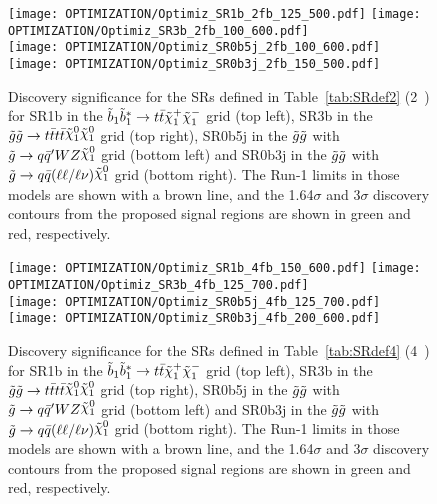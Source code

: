 \begin{figure}[!htb]
\centering
  \texttt{[image: OPTIMIZATION/Optimiz\_SR1b\_2fb\_125\_500.pdf]}
  \texttt{[image: OPTIMIZATION/Optimiz\_SR3b\_2fb\_100\_600.pdf]}\\
  \texttt{[image: OPTIMIZATION/Optimiz\_SR0b5j\_2fb\_100\_600.pdf]}
  \texttt{[image: OPTIMIZATION/Optimiz\_SR0b3j\_2fb\_150\_500.pdf]}
  \caption{Discovery significance for the SRs defined in Table~\ref{tab:SRdef2} (2~\ifb) for SR1b in the $\sbot\sbot^*\to t\bar t\tilde\chi_1^+\tilde\chi_1^-$ grid (top left), SR3b in the $\gluino\gluino\to t\bar tt\bar t\ninoone\ninoone$ grid (top right), SR0b5j in the $\tilde{g}\tilde{g}$ with $\gluino\to q\bar{q}'WZ\ninoone$ grid (bottom left) and SR0b3j in the $\tilde{g}\tilde{g}$ with $\gluino\to q\bar{q}(\ell\ell/\ell\nu)\ninoone$ grid (bottom right). The Run-1 limits in those models are shown with a brown line, and the 1.64$\sigma$ and 3$\sigma$ discovery contours from the proposed signal regions are shown in green and red, respectively.}
\label{fig:OptimSig2}
\end{figure}


\begin{figure}[!htb]
\centering
  \texttt{[image: OPTIMIZATION/Optimiz\_SR1b\_4fb\_150\_600.pdf]}
  \texttt{[image: OPTIMIZATION/Optimiz\_SR3b\_4fb\_125\_700.pdf]}\\
  \texttt{[image: OPTIMIZATION/Optimiz\_SR0b5j\_4fb\_125\_700.pdf]}
  \texttt{[image: OPTIMIZATION/Optimiz\_SR0b3j\_4fb\_200\_600.pdf]}
  \caption{Discovery significance for the SRs defined in Table~\ref{tab:SRdef4} (4~\ifb) for SR1b in the $\sbot\sbot^*\to t\bar t\tilde\chi_1^+\tilde\chi_1^-$ grid (top left), SR3b in the $\gluino\gluino\to t\bar tt\bar t\ninoone\ninoone$ grid (top right), SR0b5j in the $\tilde{g}\tilde{g}$ with $\gluino\to q\bar{q}'WZ\ninoone$ grid (bottom left) and SR0b3j in the $\tilde{g}\tilde{g}$ with $\gluino\to q\bar{q}(\ell\ell/\ell\nu)\ninoone$ grid (bottom right). The Run-1 limits in those models are shown with a brown line, and the 1.64$\sigma$ and 3$\sigma$ discovery contours from the proposed signal regions are shown in green and red, respectively.}
\label{fig:OptimSig4}
\end{figure}


